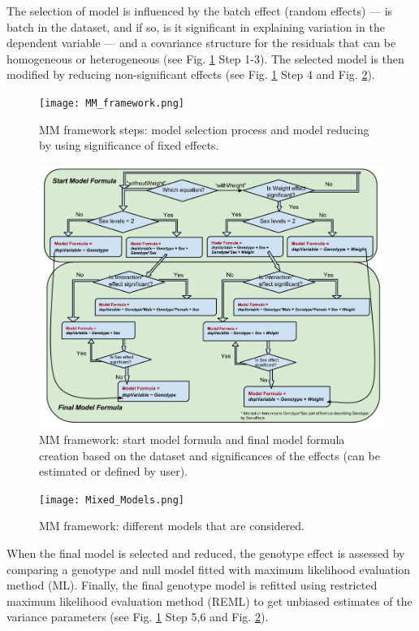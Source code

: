 \documentclass[12pt,a4paper]{article}
\begin{document}
The selection of model is influenced by the batch effect (random effects) --- is batch in the dataset, and if so, is it significant in explaining variation in the dependent variable --- and a covariance structure for the residuals that can be homogeneous or heterogeneous (see Fig. \ref{fig:02} Step 1-3).
The selected model is then modified by reducing non-significant effects (see Fig. \ref{fig:02} Step 4 and Fig. \ref{fig:03}).

\begin{figure}[!tpb]%
\centerline{\texttt{[image: MM\_framework.png]}}
\caption{MM framework steps: model selection process and model reducing by using significance of fixed effects.}\label{fig:02}
\end{figure}

\begin{figure}[!tpb]%
\centerline{\includegraphics[scale=0.5]{Model_Formula.png}}
\caption{MM framework: start model formula and final model formula creation based on the dataset and significances of the effects (can be estimated or defined by user). }\label{fig:03}
\end{figure}

\begin{figure}[!tpb]%
\centerline{\texttt{[image: Mixed\_Models.png]}}
\caption{MM framework: different models that are considered. }\label{fig:04}
\end{figure}

When the final model is selected and reduced, the genotype effect is assessed by comparing a genotype and null model fitted with maximum likelihood evaluation method (ML). Finally, the final genotype model is refitted using restricted maximum likelihood evaluation method (REML) to get unbiased estimates of the variance parameters (see Fig. \ref{fig:02} Step 5,6 and Fig. \ref{fig:03}).   
\end{document}
